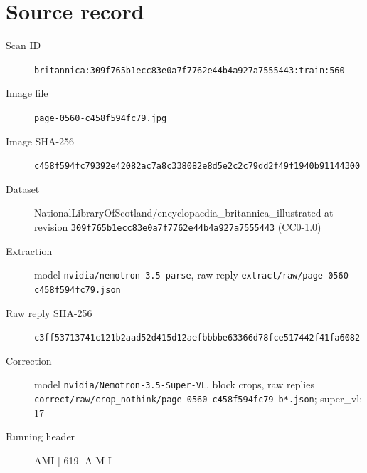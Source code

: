 \documentclass{article}
\begin{document}
\section*{Source record}
\begin{description}
\item[Scan ID] \texttt{britannica:309f765b1ecc83e0a7f7762e44b4a927a7555443:train:560}
\item[Image file] \texttt{page-0560-c458f594fc79.jpg}
\item[Image SHA-256] \texttt{c458f594fc79392e42082ac7a8c338082e8d5e2c2c79dd2f49f1940b91144300}
\item[Dataset] NationalLibraryOfScotland/encyclopaedia\_britannica\_illustrated at revision \texttt{309f765b1ecc83e0a7f7762e44b4a927a7555443} (CC0-1.0)
\item[Extraction] model \texttt{nvidia/nemotron-3.5-parse}, raw reply \texttt{extract/raw/page-0560-c458f594fc79.json}
\item[Raw reply SHA-256] \texttt{c3ff53713741c121b2aad52d415d12aefbbbbe63366d78fce517442f41fa6082}
\item[Correction] model \texttt{nvidia/Nemotron-3.5-Super-VL}, block crops, raw replies \texttt{correct/raw/crop\_nothink/page-0560-c458f594fc79-b*.json}; super\_vl: 17
\item[Running header] AMI [ 619] A M I
\end{description}
\end{document}
